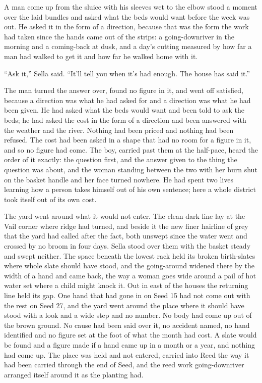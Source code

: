 A man come up from the sluice with his sleeves wet to the elbow stood a moment over the laid bundles and asked what the beds would want before the week was out. He asked it in the form of a direction, because that was the form the work had taken since the hands came out of the strips: a going-downriver in the morning and a coming-back at dusk, and a day's cutting measured by how far a man had walked to get it and how far he walked home with it.

“Ask it,” Sella said. “It'll tell you when it's had enough. The house has said it.”

The man turned the answer over, found no figure in it, and went off satisfied, because a direction was what he had asked for and a direction was what he had been given. He had asked what the beds would want and been told to ask the beds; he had asked the cost in the form of a direction and been answered with the weather and the river. Nothing had been priced and nothing had been refused. The cost had been asked in a shape that had no room for a figure in it, and so no figure had come. The boy, carried past them at the half-pace, heard the order of it exactly: the question first, and the answer given to the thing the question was about, and the woman standing between the two with her burn shut on the basket handle and her face turned nowhere. He had spent two lives learning how a person takes himself out of his own sentence; here a whole district took itself out of its own cost.

\scenebreak

The yard went around what it would not enter. The clean dark line lay at the Vail corner where  ridge had turned, and beside it the new finer hairline of grey that the yard had called  after the fact, both unswept since the water went and crossed by no broom in four days. Sella stood over them with the basket steady and swept neither. The space beneath the lowest rack held its broken birth-slates where whole slate should have stood, and the going-around widened there by the width of a hand and came back, the way a woman goes wide around a pail of hot water set where a child might knock it. Out in  east of the houses the returning line held its gap. One hand that had gone in on Seed 15 had not come out with the rest on Seed 27, and the yard went around the place where it should have stood with a look and a wide step and no number. No body had come up out of the brown ground. No cause had been said over it, no accident named, no hand identified and no figure set at the foot of what the month had cost. A slate would be found and a figure made if a hand came up in a month or a year, and nothing had come up. The place was held and not entered, carried into Reed the way it had been carried through the end of Seed, and the reed work going-downriver arranged itself around it as the planting had.

